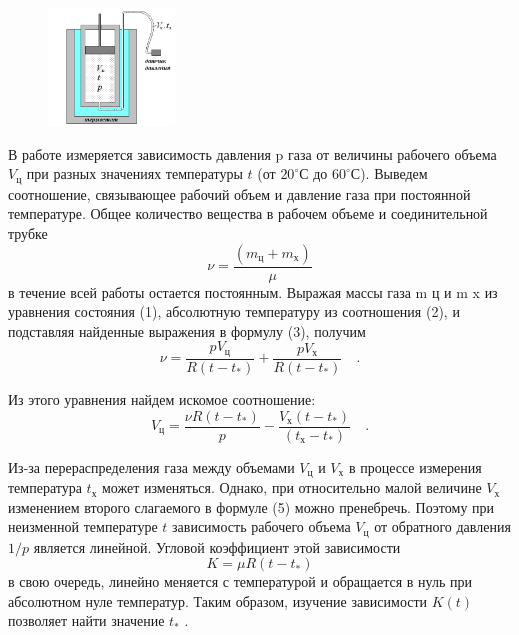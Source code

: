 \documentclass[11pt,a4paper]{article}
\begin{document}
\begin{figure}
	\includegraphics[width=0.3\textwidth]{../im1.png}
	\caption{}
\end{figure}

В работе измеряется зависимость давления p газа от
величины рабочего объема $V_ц$ при разных значениях
температуры $t$ (от $20^\circ С$ до $60^\circ С$). Выведем соотношение,
связывающее рабочий объем и давление газа при постоянной
температуре. Общее количество вещества в рабочем объеме и
соединительной трубке
\begin{equation}
	\nu = \frac{(m_ц + m_х)}{\mu}
\end{equation}
в течение всей работы остается постоянным. Выражая массы газа m ц и m x из уравнения
состояния (1), абсолютную температуру из соотношения (2), и подставляя найденные
выражения в формулу (3), получим
\begin{equation}
	\nu = \frac{pV_ц}{R(t - t_*)} + \frac{pV_х}{R(t - t_*)} \quad .
\end{equation}

Из этого уравнения найдем искомое соотношение:
\begin{equation}
	V_ц = \frac{\nu R(t - t_*)}{p} - \frac{V_х(t - t_*)}{(t_х - t_*)} \quad .
\end{equation}

Из-за перераспределения газа между объемами $V_ц$ и $V_х$ в процессе измерения температура $t_х$
может изменяться. Однако, при относительно малой величине $V_х$ изменением второго
слагаемого в формуле (5) можно пренебречь. Поэтому при неизменной температуре $t$
зависимость рабочего объема $V_ц$ от обратного давления $1/p$ является линейной. Угловой
коэффициент этой зависимости
\begin{equation}
	K = \mu R(t - t_*)
\end{equation}
в свою очередь, линейно меняется с температурой и обращается в нуль при абсолютном нуле
температур. Таким образом, изучение зависимости $K(t)$ позволяет найти значение $t_*$ .
\end{document}
